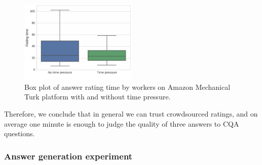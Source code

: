 \begin{figure}
    \centering
    \includegraphics[width=0.5\textwidth]{img/validation_time}
    \caption{Box plot of answer rating time by workers on Amazon Mechanical Turk platform with and without time pressure.}
    \label{figure:non-factoid:crowdsourcing:validation_time}
\end{figure}

Therefore, we conclude that in general we can trust crowdsourced ratings, and on average one minute is enough to judge the quality of three answers to CQA questions.

\subsubsection{Answer generation experiment}
\label{section:non-factoid:crowdsourcing:approach:experiments:generation}

